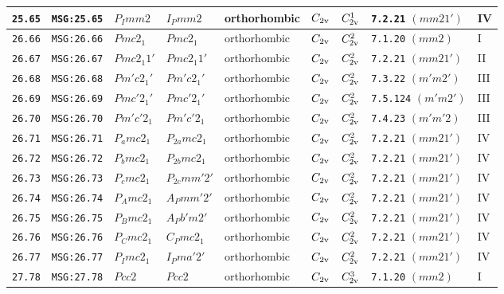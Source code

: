 \documentclass[fleqn,10pt]{jsarticle}
\begin{document}
\begin{center}
\begin{longtable}{lllllllll}
\texttt{25.65} & \texttt{MSG:25.65} & $P_{I}mm2$ & $I_{P}mm2$ & orthorhombic & $C_{\rm 2v}$ & $C_{\rm 2v}^{1}$ & \texttt{7.2.21} $(mm21')$ & IV \\ \hline
\texttt{26.66} & \texttt{MSG:26.66} & $Pmc2_{1}$ & $Pmc2_{1}$ & orthorhombic & $C_{\rm 2v}$ & $C_{\rm 2v}^{2}$ & \texttt{7.1.20} $(mm2)$ & I \\
\texttt{26.67} & \texttt{MSG:26.67} & $Pmc2_{1}1'$ & $Pmc2_{1}1'$ & orthorhombic & $C_{\rm 2v}$ & $C_{\rm 2v}^{2}$ & \texttt{7.2.21} $(mm21')$ & II \\
\texttt{26.68} & \texttt{MSG:26.68} & $Pm'c2_{1}'$ & $Pm'c2_{1}'$ & orthorhombic & $C_{\rm 2v}$ & $C_{\rm 2v}^{2}$ & \texttt{7.3.22} $(m'm2')$ & III \\
\texttt{26.69} & \texttt{MSG:26.69} & $Pmc'2_{1}'$ & $Pmc'2_{1}'$ & orthorhombic & $C_{\rm 2v}$ & $C_{\rm 2v}^{2}$ & \texttt{7.5.124} $(m'm2')$ & III \\
\texttt{26.70} & \texttt{MSG:26.70} & $Pm'c'2_{1}$ & $Pm'c'2_{1}$ & orthorhombic & $C_{\rm 2v}$ & $C_{\rm 2v}^{2}$ & \texttt{7.4.23} $(m'm'2)$ & III \\
\texttt{26.71} & \texttt{MSG:26.71} & $P_{a}mc2_{1}$ & $P_{2a}mc2_{1}$ & orthorhombic & $C_{\rm 2v}$ & $C_{\rm 2v}^{2}$ & \texttt{7.2.21} $(mm21')$ & IV \\
\texttt{26.72} & \texttt{MSG:26.72} & $P_{b}mc2_{1}$ & $P_{2b}mc2_{1}$ & orthorhombic & $C_{\rm 2v}$ & $C_{\rm 2v}^{2}$ & \texttt{7.2.21} $(mm21')$ & IV \\
\texttt{26.73} & \texttt{MSG:26.73} & $P_{c}mc2_{1}$ & $P_{2c}mm'2'$ & orthorhombic & $C_{\rm 2v}$ & $C_{\rm 2v}^{2}$ & \texttt{7.2.21} $(mm21')$ & IV \\
\texttt{26.74} & \texttt{MSG:26.74} & $P_{A}mc2_{1}$ & $A_{P}mm'2'$ & orthorhombic & $C_{\rm 2v}$ & $C_{\rm 2v}^{2}$ & \texttt{7.2.21} $(mm21')$ & IV \\
\texttt{26.75} & \texttt{MSG:26.75} & $P_{B}mc2_{1}$ & $A_{P}b'm2'$ & orthorhombic & $C_{\rm 2v}$ & $C_{\rm 2v}^{2}$ & \texttt{7.2.21} $(mm21')$ & IV \\
\texttt{26.76} & \texttt{MSG:26.76} & $P_{C}mc2_{1}$ & $C_{P}mc2_{1}$ & orthorhombic & $C_{\rm 2v}$ & $C_{\rm 2v}^{2}$ & \texttt{7.2.21} $(mm21')$ & IV \\
\texttt{26.77} & \texttt{MSG:26.77} & $P_{I}mc2_{1}$ & $I_{P}ma'2'$ & orthorhombic & $C_{\rm 2v}$ & $C_{\rm 2v}^{2}$ & \texttt{7.2.21} $(mm21')$ & IV \\ \hline
\texttt{27.78} & \texttt{MSG:27.78} & $Pcc2$ & $Pcc2$ & orthorhombic & $C_{\rm 2v}$ & $C_{\rm 2v}^{3}$ & \texttt{7.1.20} $(mm2)$ & I \\

\end{longtable}
\end{center}
\end{document}
